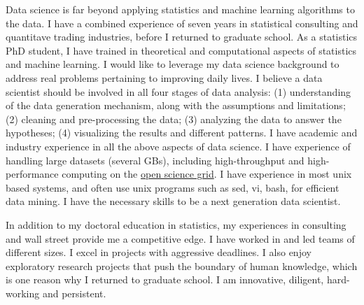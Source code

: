 \documentclass{letter} %
\begin{document}
\begin{letter}
\noindent %
Data science is far beyond applying statistics and machine learning algorithms to the data. I have a combined experience of seven years in statistical consulting and quantitave trading industries, before I returned to graduate school. As a statistics PhD student, I have trained in theoretical and computational aspects of statistics and machine learning. I would like to leverage my data science background to address real problems pertaining to improving daily lives. I believe a data scientist should be involved in all four stages of data analysis: (1) understanding of the data generation mechanism, along with the assumptions and limitations; (2) cleaning and pre-processing the data; (3) analyzing the data to answer the hypotheses; (4) visualizing the results and different patterns. I have academic and industry experience in all the above aspects of data science. I have experience of handling large datasets (several GBs), including high-throughput and high-performance computing on the \href{http://www.opensciencegrid.org/}{open science grid}. I have experience in most unix based systems, and often use unix programs such as sed, vi, bash, for efficient data mining. I have the necessary skills to be a next generation data scientist. 

In addition to my doctoral education in statistics, my experiences in consulting and wall street provide me a competitive edge. I have worked in and led teams of different sizes. I excel in projects with aggressive deadlines. I also enjoy exploratory research projects that push the boundary of human knowledge, which is one reason why I returned to graduate school. I am innovative, diligent, hard-working and persistent. 


\end{letter}
\end{document}
